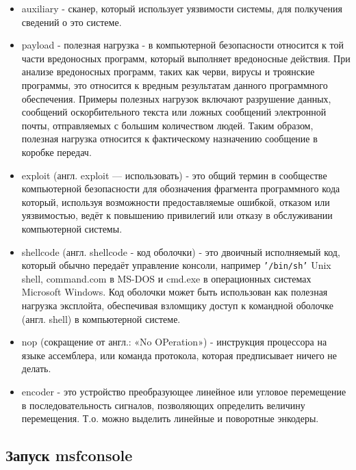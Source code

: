 \documentclass[11pt, a4paper]{article}		%
\begin{document}
\begin{itemize}
\item auxiliary - сканер, который использует уязвимости системы, для полкучения сведений о это системе.

\item payload - полезная нагрузка - в компьютерной безопасности относится к той части вредоносных программ, который выполняет вредоносные действия. При анализе вредоносных программ, таких как черви, вирусы и троянские программы, это относится к вредным результатам данного программного обеспечения. Примеры полезных нагрузок включают разрушение данных, сообщений оскорбительного текста или ложных сообщений электронной почты, отправляемых с большим количеством людей. Таким образом, полезная нагрузка относится к фактическому назначению сообщение в коробке передач.

\item exploit (англ. exploit — использовать) - это общий термин в сообществе компьютерной безопасности для обозначения фрагмента программного кода который, используя возможности предоставляемые ошибкой, отказом или уязвимостью, ведёт к повышению привилегий или отказу в обслуживании компьютерной системы.

\item shellcode (англ. shellcode - код оболочки) - это двоичный исполняемый код, который обычно передаёт управление консоли, например \verb'’/bin/sh’' Unix shell, command.com в MS-DOS и cmd.exe в операционных системах Microsoft Windows. Код оболочки может быть использован как полезная нагрузка эксплойта, обеспечивая взломщику доступ к командной оболочке (англ. shell) в компьютерной системе.

\item nop (сокращение от англ.: «No OPeration») - инструкция процессора на языке ассемблера, или команда протокола, которая предписывает ничего не делать.

\item encoder - это устройство преобразующее линейное или угловое перемещение в последовательность сигналов, позволяющих определить величину перемещения. Т.о. можно выделить линейные и поворотные энкодеры.

\end{itemize}


\subsection{Запуск msfconsole}
\end{document}

